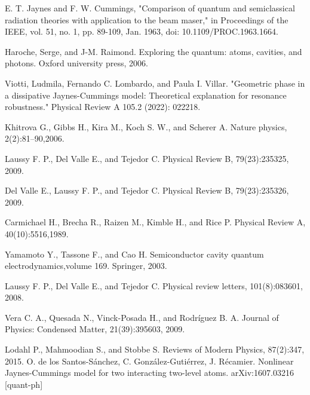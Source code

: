 \label{ch:referencias}
\renewcommand\bibname{Referencias}


%



\begin{thebibliography}{9}



E. T. Jaynes and F. W. Cummings, "Comparison of quantum and semiclassical radiation theories with application to the beam maser," in Proceedings of the IEEE, vol. 51, no. 1, pp. 89-109, Jan. 1963, doi: 10.1109/PROC.1963.1664.

Haroche, Serge, and J-M. Raimond. Exploring the quantum: atoms, cavities, and photons. Oxford university press, 2006.

Viotti, Ludmila, Fernando C. Lombardo, and Paula I. Villar. "Geometric phase in a dissipative Jaynes-Cummings model: Theoretical explanation for resonance robustness." Physical Review A 105.2 (2022): 022218.

Khitrova G., Gibbs H., Kira M., Koch S. W., and Scherer A. Nature physics, 2(2):81–90,2006.

Laussy F. P., Del Valle E., and Tejedor C. Physical Review B, 79(23):235325, 2009.

 Del Valle E., Laussy F. P., and Tejedor C. Physical Review B, 79(23):235326, 2009.

Carmichael H., Brecha R., Raizen M., Kimble H., and Rice P. Physical Review A, 40(10):5516,1989.

Yamamoto Y., Tassone F., and Cao H. Semiconductor cavity quantum electrodynamics,volume 169. Springer, 2003.

Laussy F. P., Del Valle E., and Tejedor C. Physical review letters, 101(8):083601, 2008.

 Vera C. A., Quesada N., Vinck-Posada H., and Rodríguez B. A. Journal of Physics: Condensed Matter, 21(39):395603, 2009.

Lodahl P., Mahmoodian S., and Stobbe S. Reviews of Modern Physics, 87(2):347, 2015.
O. de los Santos-Sánchez, C. González-Gutiérrez, J. Récamier. Nonlinear Jaynes-Cummings model for two interacting two-level atoms. arXiv:1607.03216 [quant-ph]


\end{thebibliography}
